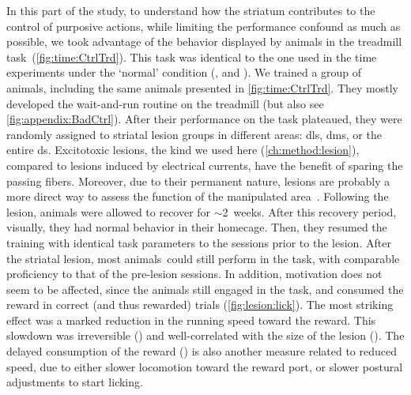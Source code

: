 \par
In this part of the study, to understand how the striatum contributes to the control of purposive actions, while limiting the performance confound as much as possible, we took advantage of the behavior displayed by animals in the treadmill task~(\autoref{fig:time:CtrlTrd}).
This task was identical to the one used in the time experiments under the `normal' condition (, and ).
We trained a group of animals, including the same animals presented in \autoref{fig:time:CtrlTrd}.
They mostly developed the wait-and-run routine on the treadmill (but also see \autoref{fig:appendix:BadCtrl}).
After their performance on the task plateaued, they were randomly assigned to striatal lesion groups in different areas:
    \gls{dls}, \gls{dms}, or the entire \gls{ds}.
Excitotoxic lesions, the kind we used here (\autoref{ch:method:lesion}), compared to lesions induced by electrical currents, have the benefit of sparing the passing fibers.
Moreover, due to their permanent nature, lesions are probably a more direct way to assess the function of the manipulated area~\cite{Otchy2015Nature}.
Following the lesion, animals were allowed to recover for $\sim$2~weeks.
After this recovery period, visually, they had normal behavior in their homecage.
Then, they resumed the training with identical task parameters to the sessions prior to the lesion.
After the striatal lesion, most animals\footnotemark\ could still perform in the task, with comparable proficiency to that of the pre-lesion sessions.
In addition, motivation does not seem to be affected, since the animals still engaged in the task, and consumed the reward in correct (and thus rewarded) trials (\autoref{fig:lesion:lick}).
The most striking effect was a marked reduction in the running speed toward the reward.
This slowdown was irreversible () and well-correlated with the size of the lesion ().
The delayed consumption of the reward () is also another measure related to reduced speed, due to either slower locomotion toward the reward port, or slower postural adjustments to start licking.
